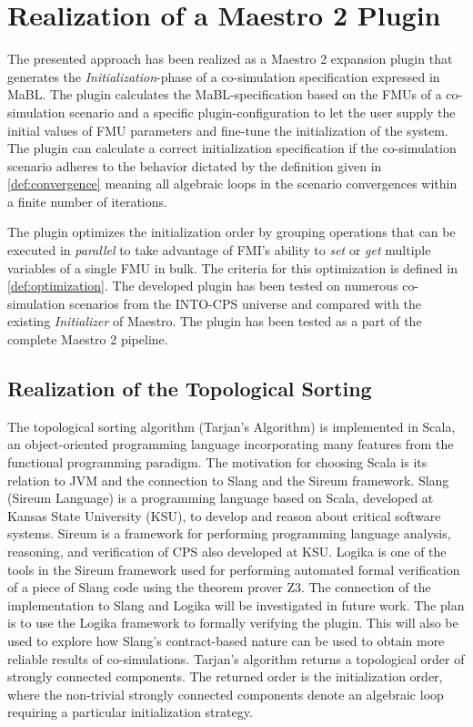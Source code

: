\section{Realization of a Maestro 2 Plugin}\label{sc:implementation}
The presented approach has been realized as a Maestro 2 expansion plugin that generates the \textit{Initialization}-phase of a co-simulation specification expressed in MaBL. The plugin calculates the MaBL-specification based on the FMUs of a co-simulation scenario and a specific plugin-configuration to let the user supply the initial values of FMU parameters and fine-tune the initialization of the system. The plugin can calculate a correct initialization specification if the co-simulation scenario adheres to the behavior dictated by the definition given in \cref{def:convergence} meaning all algebraic loops in the scenario convergences within a finite number of iterations.

The plugin optimizes the initialization order by grouping operations that can be executed in \textit{parallel} to take advantage of FMI's ability to \textit{set} or \textit{get} multiple variables of a single FMU in bulk. The criteria for this optimization is defined in \cref{def:optimization}. 
The developed plugin has been tested on numerous co-simulation scenarios from the INTO-CPS universe\cite{Maestro} and compared with the existing \textit{Initializer} of Maestro. The plugin has been tested as a part of the complete Maestro 2 pipeline. 

\subsection{Realization of the Topological Sorting}
The topological sorting algorithm (Tarjan's Algorithm) is implemented in Scala\cite{Scala}, an object-oriented programming language incorporating many features from the functional programming paradigm. The motivation for choosing Scala\cite{Scala} is its relation to JVM and the connection to Slang and the Sireum framework\cite{Robby2018}. Slang (Sireum Language) is a programming language based on Scala, developed at Kansas State University (KSU), to develop and reason about critical software systems. Sireum is a framework for performing programming language analysis, reasoning, and verification of CPS also developed at KSU. Logika is one of the tools in the Sireum framework used for performing automated formal verification of a piece of Slang code using the theorem prover Z3\cite{Z3prover2020Sep}.
The connection of the implementation to Slang and Logika will be investigated in future work. The plan is to use the Logika framework to formally verifying the plugin. This will also be used to explore how Slang's contract-based nature can be used to obtain more reliable results of co-simulations. Tarjan's algorithm returns a topological order of strongly connected components. The returned order is the initialization order, where the non-trivial strongly connected components denote an algebraic loop requiring a particular initialization strategy. 

